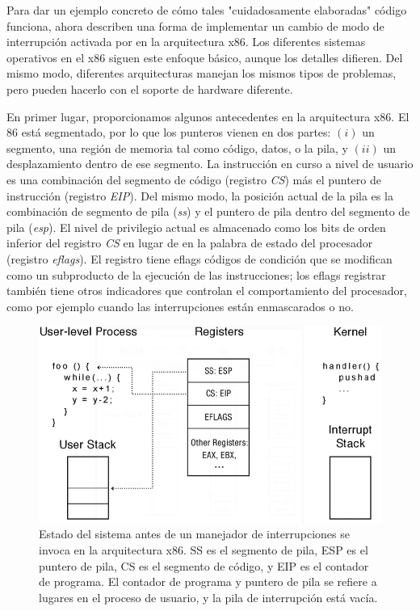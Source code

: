 \documentclass[10pt]{book}
\begin{document}
Para dar un ejemplo concreto de cómo tales "cuidadosamente elaboradas" código funciona, ahora describen una forma de implementar un cambio de modo de interrupción activada por en la arquitectura x86. Los diferentes sistemas operativos en el x86 siguen este enfoque básico, aunque los detalles difieren. Del mismo modo, diferentes arquitecturas manejan los mismos tipos de problemas, pero pueden hacerlo con el soporte de hardware diferente.

En primer lugar, proporcionamos algunos antecedentes en la arquitectura x$86$. El $86$ está segmentado, por lo que los punteros vienen en dos partes: $(i)$ un segmento, una región de memoria tal como código, datos, o la pila, y $(ii)$ un desplazamiento dentro de ese segmento. La instrucción en curso a nivel de usuario es una combinación del segmento de código (registro \textit{CS}) más el puntero de instrucción (registro \textit{EIP}). Del mismo modo, la posición actual de la pila es la combinación de segmento de pila (\textit{ss}) y el puntero de pila dentro del segmento de pila (\textit{esp}). El nivel de privilegio actual es almacenado como los bits de orden inferior del registro \textit{CS} en lugar de en la palabra de estado del procesador (registro \textit{eflags}). El registro tiene eflags códigos de condición que se modifican como un subproducto de la ejecución de las instrucciones; los eflags registrar también tiene otros indicadores que controlan el comportamiento del procesador, como por ejemplo cuando las interrupciones están enmascarados o no.

\begin{figure}[tbhp]
\centerline{\includegraphics[scale=0.55]{img/fig07}}
\caption{Estado del sistema antes de un manejador de interrupciones se invoca en la arquitectura x86. SS es el segmento de pila, ESP es el puntero de pila, CS es el segmento de código, y EIP es el contador de programa. El contador de programa y puntero de pila se refiere a lugares en el proceso de usuario, y la pila de interrupción está vacía.}
\label{fig07}
\end{figure}
\end{document}
